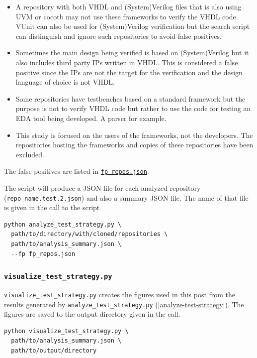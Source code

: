 \documentclass[]{report}
\providecommand{\tightlist}{%
  \setlength{\itemsep}{0pt}\setlength{\parskip}{0pt}}
\begin{document}
\begin{itemize}
\tightlist
\item
  A repository with both VHDL and (System)Verilog files that is also using UVM or cocotb may not use these frameworks to verify the VHDL code. VUnit can also be used for (System)Verilog verification but the search script can distinguish and ignore such repositories to avoid false positives.
\item
  Sometimes the main design being verified is based on (System)Verilog but it also includes third party IPs written in VHDL. This is considered a false positive since the IPs are not the target for the verification and the design language of choice is not VHDL.
\item
  Some repositories have testbenches based on a standard framework but the purpose is not to verify VHDL code but rather to use the code for testing an EDA tool being developed. A parser for example.
\item
  This study is focused on the users of the frameworks, not the developers. The repositories hosting the frameworks and copies of these repositories have been excluded.
\end{itemize}

The false positives are listed in \href{https://github.com/LarsAsplund/github-facts/tree/main/fp_repos.json}{\texttt{fp\_repos.json}}.

The script will produce a JSON file for each analyzed repository (\texttt{repo\_name.test.2.json}) and also a summary JSON file. The name of that file is given in the call to the script

\begin{verbatim}
python analyze_test_strategy.py \
  path/to/directory/with/cloned/repositories \
  path/to/analysis_summary.json \
  --fp fp_repos.json
\end{verbatim}

\hypertarget{visualize_test_strategy.py}{%
\subsubsection{\texorpdfstring{\texttt{visualize\_test\_strategy.py}}{visualize\_test\_strategy.py}}\label{visualize_test_strategy.py}}

\href{https://github.com/LarsAsplund/github-facts/tree/main/py/visualize_test_strategy.py}{\texttt{visualize\_test\_strategy.py}} creates the figures used in this post from the results generated by \texttt{analyze\_test\_strategy.py} (\ref{analyze-test-strategy}). The figures are saved to the output directory given in the call.

\begin{verbatim}
python visualize_test_strategy.py \
  path/to/analysis_summary.json \
  path/to/output/directory
\end{verbatim}

\printbibliography[title=References]
\end{document}
